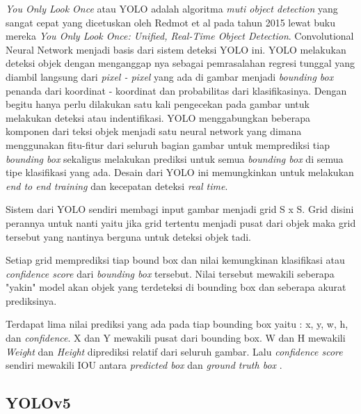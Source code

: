 \emph{You Only Look Once} atau YOLO adalah algoritma \emph{muti object detection} yang sangat cepat yang dicetuskan oleh Redmot et al pada tahun 2015
lewat buku mereka \emph{You Only Look Once: Unified, Real-Time Object Detection}\cite{redmon2016you}. Convolutional Neural Network menjadi basis dari sistem deteksi YOLO ini.
YOLO melakukan deteksi objek dengan menganggap nya sebagai pemrasalahan regresi tunggal yang diambil langsung dari \emph{pixel - pixel} yang ada
di gambar menjadi \emph{bounding box} penanda dari koordinat - koordinat dan probabilitas dari klasifikasinya. Dengan begitu
hanya perlu dilakukan satu kali pengecekan pada gambar untuk melakukan deteksi atau indentifikasi. \cite{redmon2016you}
YOLO menggabungkan beberapa komponen dari teksi objek menjadi satu neural network yang dimana menggunakan fitu-fitur
dari seluruh bagian gambar untuk memprediksi tiap \emph{bounding box} sekaligus melakukan prediksi untuk semua
\emph{bounding box} di semua tipe klasifikasi yang ada. Desain dari YOLO ini memungkinkan untuk melakukan
\emph{end to end training} dan kecepatan deteksi \emph{real time}.

\par Sistem dari YOLO sendiri membagi input gambar menjadi grid S x S. Grid disini perannya untuk 
nanti yaitu jika grid tertentu menjadi pusat dari objek maka grid tersebut yang nantinya berguna untuk deteksi objek tadi.

\par Setiap grid memprediksi tiap bound box dan nilai kemungkinan klasifikasi atau \emph{confidence score} dari \emph{bounding box} tersebut.
Nilai tersebut mewakili seberapa "yakin" model akan objek yang terdeteksi di bounding box dan seberapa akurat
prediksinya. 

\par Terdapat lima nilai prediksi yang ada pada tiap bounding box yaitu : x, y, w, h, dan \emph{confidence}.
X dan Y mewakili pusat dari bounding box. W dan H mewakili \emph{Weight} dan \emph{Height} diprediksi relatif
dari seluruh gambar. Lalu \emph{confidence score} sendiri mewakili IOU antara \emph{predicted box} dan \emph{ground truth box} \cite{redmon2016you}.

\subsection{YOLOv5}
\label{subsec:yolov5}

